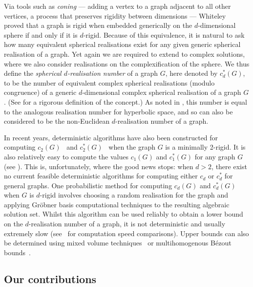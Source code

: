 \documentclass[ALCO]{cedram}
\begin{document}
Via tools such as \emph{coning} --- adding a vertex to a graph adjacent to all other vertices, a process that preserves rigidity between dimensions --- Whiteley~\cite{coning} proved that a graph is rigid when embedded generically on the $d$-dimensional sphere if and only if it is $d$-rigid.
Because of this equivalence, it is natural to ask how many equivalent spherical realisations exist for any given generic spherical realisation of a graph.
Yet again we are required to extend to complex solutions, where we also consider realisations on the complexification of the sphere.
We thus define the \emph{spherical $d$-realisation number} of a graph $G$, here denoted by $c^*_d(G)$, to be the number of equivalent complex spherical realisations (modulo congruence) of a generic $d$-dimensional complex spherical realisation of a graph $G$.
(See  for a rigorous definition of the concept.)
As noted in ,
this number is equal to the analogous realisation number for hyperbolic space,
and so can also be considered to be the non-Euclidean $d$-realisation number of a graph.

In recent years, deterministic algorithms have also been constructed for computing $c_2(G)$~\cite{PlaneCount} and $c_2^*(G)$~\cite{SphereCount} when the graph $G$ is a minimally 2-rigid.
It is also relatively easy to compute the values $c_1(G)$ and $c_1^*(G)$ for any graph $G$ (see ).
This is, unfortunately, where the good news stops:
when $d >2$, there exist no current feasible deterministic algorithms for computing either $c_d$ or $c_d^*$ for general graphs.
One probabilistic method for computing $c_d(G)$ and $c_d^*(G)$ when $G$ is $d$-rigid involves choosing a random realisation for the graph and applying Gr\"{o}bner basis computational techniques to the resulting algebraic solution set.
Whilst this algorithm can be used reliably to obtain a lower bound on the $d$-realisation number of a graph,
it is not deterministic and usually extremely slow (see~\cite[Section 5]{PlaneCount} for computation speed comparisons).
Upper bounds can also be determined using mixed volume techniques~\cite{Steffens2010} or multihomogenous B\'{e}zout bounds~\cite{Bartzos2020}.


\subsection{Our contributions}
\end{document}
